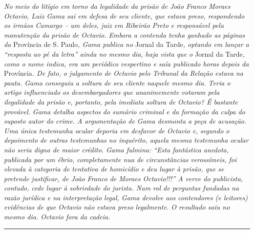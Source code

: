 \emph{No meio do litígio em torno da legalidade da prisão de João Franco
Moraes Octavio, Luiz Gama sai em defesa de seu cliente, que estava
preso, respondendo os irmãos Camargo -- um deles, juiz em Ribeirão Preto
e responsável pela manutenção da prisão de Octavio. Embora a contenda
tenha ganhado as páginas da} Província de S. Paulo\emph{, Gama publica
no} Jornal da Tarde\emph{, optando em lançar a ``resposta ao pé da
letra'' ainda no mesmo dia, haja vista que o} Jornal da Tarde\emph{,
como o nome indica, era um periódico vespertino e saía publicado horas
depois da} Província\emph{. De fato, o julgamento de Octavio pelo
Tribunal da Relação estava na pauta. Gama conseguiu a soltura de seu
cliente naquele mesmo dia. Teria o artigo influenciado os
desembargadores que unanimemente votaram pela ilegalidade da prisão e,
portanto, pela imediata soltura de Octavio? É bastante provável. Gama
detalha aspectos do sumário criminal e da formação da culpa do suposto
autor do crime. A argumentação de Gama desmonta a peça de acusação. Uma
única testemunha ocular deporia em desfavor de Octavio e, segundo o
depoimento de outras testemunhas no inquérito, aquela mesma testemunha
ocular não seria digna de maior crédito. Gama fulmina: ``Esta fantástica
anedota, publicada por um ébrio, completamente nua de circunstâncias
verossímeis, foi elevada à categoria de tentativa de homicídio e deu
lugar à prisão, que se pretende justificar, de João Franco de Moraes
Octavio!!!'' A verve do publicista, contudo, cede lugar à sobriedade do
jurista. Num rol de perguntas fundadas na razão jurídica e na
interpretação legal, Gama devolve aos contendores (e leitores)
evidências de que Octavio não estava preso legalmente. O resultado saiu
no mesmo dia. Octavio fora da cadeia.}

\begin{center}\rule{0.5\linewidth}{\linethickness}\end{center}

